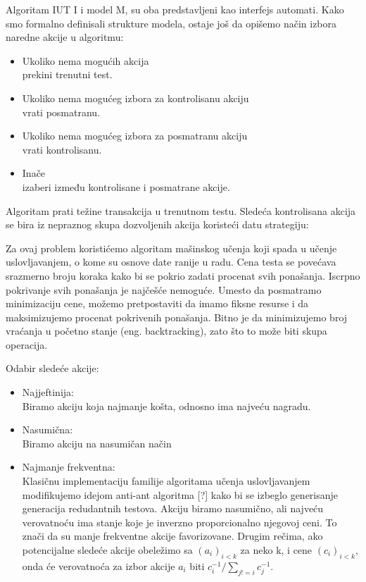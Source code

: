 \documentclass[a4paper]{article}
\theoremstyle{definition}
\begin{document}
{Algoritam %
IUT I i model M, su oba predstavljeni kao interfejs automati.
Kako smo formalno definisali strukture modela, ostaje još da opišemo način izbora naredne akcije u algoritmu:
\begin{itemize}
\item Ukoliko nema mogućih akcija\\ prekini trenutni test. 
\item Ukoliko nema mogućeg izbora za kontrolisanu akciju\\ vrati posmatranu.
\item Ukoliko nema mogućeg izbora za posmatranu akciju\\ vrati kontrolisanu.
\item Inače\\ izaberi između kontrolisane i posmatrane akcije.
\end{itemize}

Algoritam prati težine transakcija u trenutnom testu. Sledeća kontrolisana akcija se bira iz nepraznog skupa dozvoljenih akcija koristeći datu strategiju:

Za ovaj problem koristićemo algoritam mašinskog učenja koji spada u učenje uslovljavanjem, o kome su osnove date ranije u radu. 
Cena testa se povećava srazmerno broju koraka kako bi se pokrio zadati procenat svih ponašanja. Iscrpno pokrivanje svih ponašanja je najčešće nemoguće. Umesto da posmatramo minimizaciju cene, možemo pretpostaviti da imamo fiksne resurse i da maksimizujemo procenat pokrivenih ponašanja. Bitno je da minimizujemo broj vraćanja u početno stanje (eng. backtracking), zato što to može biti skupa operacija. %

Odabir sledeće akcije:
\begin{itemize}
\item Najjeftinija: \\
Biramo akciju koja najmanje košta, odnosno ima najveću nagradu.

\item Nasumična: \\
Biramo akciju na nasumičan način

\item Najmanje frekventna: \\
Klasičnu implementaciju familije algoritama učenja uslovljavanjem modifikujemo idejom anti-ant algoritma [?] kako bi se izbeglo generisanje generacija redudantnih testova.
Akciju biramo nasumično, ali najveću verovatnoću ima stanje koje je inverzno proporcionalno njegovoj ceni. To znači da su manje frekventne akcije favorizovane.
Drugim rečima, ako potencijalne sledeće akcije obeležimo sa $(a_i)_{i < k}$ za neko k, i cene $(c_i)_{i < k}$, onda će verovatnoća za izbor akcije $a_i$ biti $c_i^{-1} / \sum_{j!=i}^{} c_j^{-1}$.
\end{itemize}

}
\end{document}

